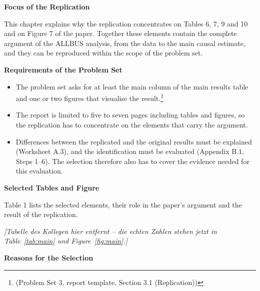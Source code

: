 \par\textbf{Focus of the Replication}\par

This chapter explains why the replication concentrates on Tables 6, 7, 9 and 10 and on Figure 7 of the paper. Together these elements contain the complete argument of the ALLBUS analysis, from the data to the main causal estimate, and they can be reproduced within the scope of the problem set.

\par\textbf{Requirements of the Problem Set}\par

\begin{itemize}
\item
  The problem set asks for at least the main column of the main results table and one or two figures that visualise the result.\footnote{(Problem Set 3, report template, Section 3.1 (Replication))}
\item
  The report is limited to five to seven pages including tables and figures, so the replication has to concentrate on the elements that carry the argument.
\item
  Differences between the replicated and the original results must be explained (Worksheet A.3), and the identification must be evaluated (Appendix B.1, Steps 1--6). The selection therefore also has to cover the evidence needed for this evaluation.
\end{itemize}

\par\textbf{Selected Tables and Figure}\par

Table 1 lists the selected elements, their role in the paper's argument and the result of the replication.

\emph{[Tabelle des Kollegen hier entfernt -- die echten Zahlen stehen jetzt in Table~\ref{tab:main} und Figure~\ref{fig:main}.]}

\par\textbf{Reasons for the Selection}\par

